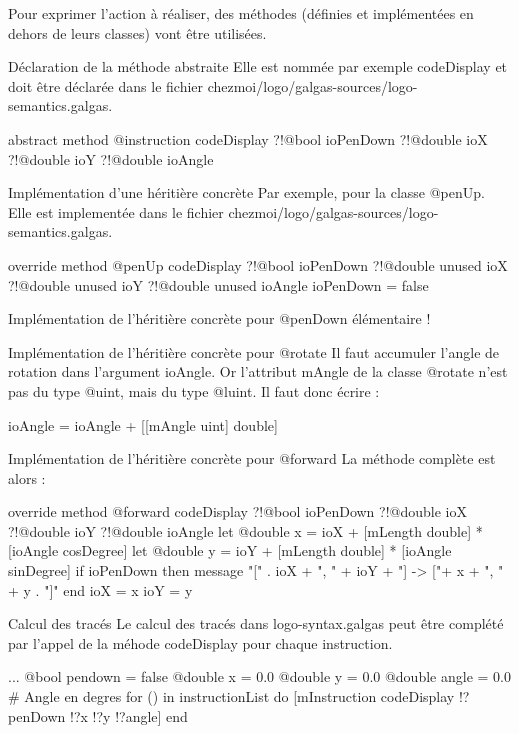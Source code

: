 Pour exprimer l'action à réaliser, des méthodes (définies et implémentées en dehors de leurs classes) vont être utilisées.

Déclaration de la méthode abstraite
Elle est nommée par exemple codeDisplay et doit être déclarée dans le fichier chezmoi/logo/galgas-sources/logo-semantics.galgas.

\begin{galgascode}
abstract method @instruction codeDisplay
  ?!@bool ioPenDown
  ?!@double ioX
  ?!@double ioY
  ?!@double ioAngle
\end{galgascode}

Implémentation d'une héritière concrète
Par exemple, pour la classe @penUp. Elle est implementée dans le fichier chezmoi/logo/galgas-sources/logo-semantics.galgas.

\begin{galgascode}
override method @penUp codeDisplay
  ?!@bool ioPenDown
  ?!@double unused ioX
  ?!@double unused ioY
  ?!@double unused ioAngle
{
  ioPenDown = false
}
\end{galgascode}

Implémentation de l'héritière concrète pour @penDown
élémentaire !

Implémentation de l'héritière concrète pour @rotate
Il faut accumuler l'angle de rotation dans l'argument ioAngle. Or l'attribut mAngle de la classe @rotate n'est pas du type @uint, mais du type @luint. Il faut donc écrire :
\begin{galgascode}
ioAngle = ioAngle + [[mAngle uint] double]
\end{galgascode}

Implémentation de l'héritière concrète pour @forward
La méthode complète est alors :

\begin{galgascode}
override method @forward codeDisplay
  ?!@bool ioPenDown
  ?!@double ioX
  ?!@double ioY
  ?!@double ioAngle
{
  let @double x = ioX + [mLength double] * [ioAngle cosDegree]
  let @double y = ioY + [mLength double] * [ioAngle sinDegree]
  if ioPenDown then
    message "[" . ioX + ", " + ioY + "] -> ["+ x + ", " + y . "]\n"
  end
  ioX = x
  ioY = y
}
\end{galgascode}

Calcul des tracés
Le calcul des tracés dans logo-syntax.galgas peut être complété par l'appel de la méhode codeDisplay pour chaque instruction.
\begin{galgascode}
  ...
  @bool pendown = false
  @double x = 0.0
  @double y = 0.0
  @double angle = 0.0 # Angle en degres
  for () in instructionList do
    [mInstruction codeDisplay !?penDown !?x !?y !?angle]
  end
\end{galgascode}

